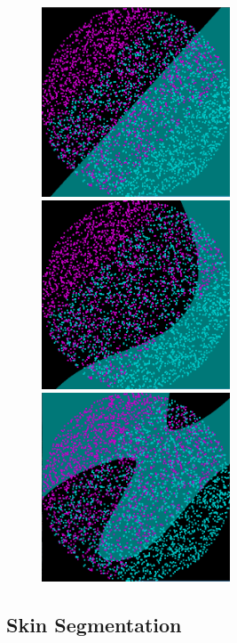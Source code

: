 \documentclass[a4paper]{article}
\begin{document}
\begin{figure}[h!]
    \includegraphics[width=0.5\textwidth]{images/svm_linear.png}
    \includegraphics[width=0.5\textwidth]{images/svm_poly.png}
    \includegraphics[width=0.5\textwidth]{images/svm_radial.png}
\end{figure}

\newpage

\subsection {Skin Segmentation}
\end{document}
